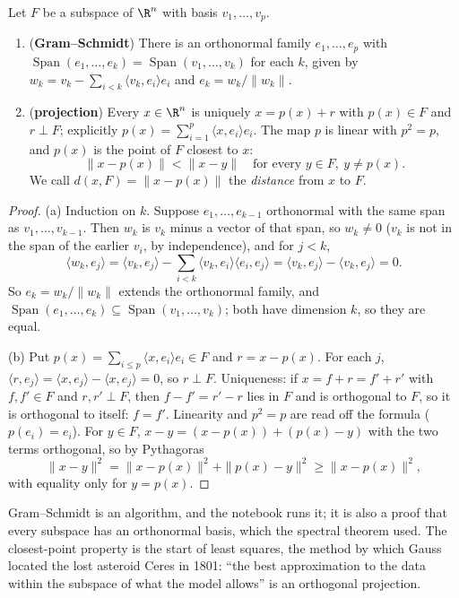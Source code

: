 \begin{theorem}\label{thm:gramschmidt}
Let $F$ be a subspace of $\R^n$ with basis $v_1,\dots,v_p$.
\begin{enumerate}[label=(\alph*)]
\item (\textbf{Gram--Schmidt}) There is an orthonormal family $e_1,\dots,e_p$ with $\operatorname{Span}(e_1,\dots,e_k)=\operatorname{Span}(v_1,\dots,v_k)$ for each $k$, given by $w_k=v_k-\sum_{i<k}\langle v_k,e_i\rangle e_i$ and $e_k=w_k/\|w_k\|$.
\item (\textbf{projection}) Every $x\in\R^n$ is uniquely $x=p(x)+r$ with $p(x)\in F$ and $r\perp F$; explicitly $p(x)=\sum_{i=1}^p\langle x,e_i\rangle e_i$. The map $p$ is linear with $p^2=p$, and $p(x)$ is the point of $F$ closest to $x$:
\[
\|x-p(x)\|<\|x-y\|\quad\text{for every }y\in F,\ y\ne p(x).
\]
We call $d(x,F)=\|x-p(x)\|$ the \emph{distance} from $x$ to $F$.
\end{enumerate}
\end{theorem}
\begin{proof}
(a) Induction on $k$. Suppose $e_1,\dots,e_{k-1}$ orthonormal with the same span as $v_1,\dots,v_{k-1}$. Then $w_k$ is $v_k$ minus a vector of that span, so $w_k\ne0$ ($v_k$ is not in the span of the earlier $v_i$, by independence), and for $j<k$,
\[
\langle w_k,e_j\rangle=\langle v_k,e_j\rangle-\sum_{i<k}\langle v_k,e_i\rangle\langle e_i,e_j\rangle=\langle v_k,e_j\rangle-\langle v_k,e_j\rangle=0 .
\]
So $e_k=w_k/\|w_k\|$ extends the orthonormal family, and $\operatorname{Span}(e_1,\dots,e_k)\subseteq\operatorname{Span}(v_1,\dots,v_k)$; both have dimension $k$, so they are equal.

(b) Put $p(x)=\sum_{i\le p}\langle x,e_i\rangle e_i\in F$ and $r=x-p(x)$. For each $j$, $\langle r,e_j\rangle=\langle x,e_j\rangle-\langle x,e_j\rangle=0$, so $r\perp F$. Uniqueness: if $x=f+r=f'+r'$ with $f,f'\in F$ and $r,r'\perp F$, then $f-f'=r'-r$ lies in $F$ and is orthogonal to $F$, so it is orthogonal to itself: $f=f'$. Linearity and $p^2=p$ are read off the formula ($p(e_i)=e_i$). For $y\in F$, $x-y=(x-p(x))+(p(x)-y)$ with the two terms orthogonal, so by Pythagoras
\[
\|x-y\|^2=\|x-p(x)\|^2+\|p(x)-y\|^2\ge\|x-p(x)\|^2,
\]
with equality only for $y=p(x)$.
\end{proof}

Gram--Schmidt is an algorithm, and the notebook runs it; it is also a proof that every subspace has an orthonormal basis, which the spectral theorem used. The closest-point property is the start of least squares, the method by which Gauss located the lost asteroid Ceres in 1801: ``the best approximation to the data within the subspace of what the model allows'' is an orthogonal projection.

